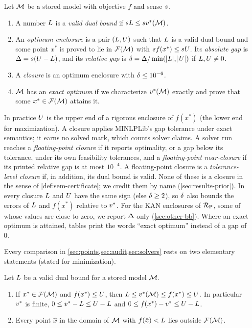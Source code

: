 \begin{definition}\label{def:sem-certificate}
Let $\mathcal{M}$ be a stored model with objective $f$ and sense $s$.
\begin{enumerate}\setlength{\itemsep}{0pt}\setlength{\parsep}{0pt}
\item[(a)] A number $L$ is a \emph{valid dual bound} if $sL\le sv^{*}(\mathcal{M})$.
\item[(b)] An \emph{optimum enclosure} is a pair $(L,U)$ such that $L$ is a valid dual bound and some point $x^*$ is proved to lie in $\mathcal{F}(\mathcal{M})$ with $s f(x^*)\le sU$.
Its \emph{absolute gap} is $\Delta=s(U-L)$, and its \emph{relative gap} is $\delta=\Delta/\min(|L|,|U|)$ if $L,U\ne0$.
\item[(c)] A \emph{closure} is an optimum enclosure with $\delta\le10^{-6}$.
\item[(d)] $\mathcal{M}$ has an \emph{exact optimum} if we characterize $v^{*}(\mathcal{M})$ exactly and prove that some $x^*\in\mathcal{F}(\mathcal{M})$ attains it.
\end{enumerate}
\end{definition}

In practice $U$ is the upper end of a rigorous enclosure of $f(x^*)$ (the lower end for maximization).
A closure applies MINLPLib's gap tolerance under exact semantics; it earns no solved mark, which counts solver claims.
A solver run reaches a \emph{floating-point closure} if it reports optimality, or a gap below its tolerance, under its own feasibility tolerances, and a \emph{floating-point near-closure} if its printed relative gap is at most $10^{-4}$.
A floating-point closure is a \emph{tolerance-level closure} if, in addition, its dual bound is valid.
None of these is a closure in the sense of \cref{def:sem-certificate}; we credit them by name (\cref{sec:results-prior}).
In every closure $L$ and $U$ have the same sign (else $\delta\ge2$), so $\delta$ also bounds the errors of $L$ and $f(x^*)$ relative to $v^{*}$.
For the KAN enclosures of $\mathcal{R}_{\mathrm{P}}$, some of whose values are close to zero, we report $\Delta$ only (\cref{sec:other-bb}).
Where an exact optimum is attained, tables print the words ``exact optimum'' instead of a gap of $0$.

Every comparison in \cref{sec:points,sec:audit,sec:solvers} rests on two elementary statements (stated for minimization).

\begin{lemma}[Enclosure]\label{lem:sem-enclosure}
Let $L$ be a valid dual bound for a stored model $\mathcal{M}$.
\begin{enumerate}\setlength{\itemsep}{0pt}\setlength{\parsep}{0pt}
\item[(a)] If $x^*\in\mathcal{F}(\mathcal{M})$ and $f(x^*)\le U$, then $L\le v^{*}(\mathcal{M})\le f(x^*)\le U$.
In particular $v^{*}$ is finite, $0\le v^{*}-L\le U-L$ and $0\le f(x^*)-v^{*}\le U-L$.
\item[(b)] Every point $\hat x$ in the domain of $\mathcal{M}$ with $f(\hat x)<L$ lies outside $\mathcal{F}(\mathcal{M})$.
\end{enumerate}
\end{lemma}

